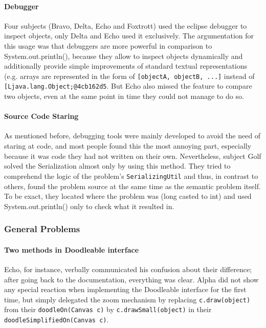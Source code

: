 \documentclass[english]{acm_proc_article-sp}
\newcommand\nes[1]{\nbc{nes}{#1}{blue}}
\begin{document}
\paragraph{Debugger}
Four subjects (Bravo, Delta, Echo and Foxtrott) used the eclipse debugger to inspect objects, only Delta and Echo used it exclusively. 
The argumentation for this usage was that debuggers are more powerful in comparison to System.out.println(), because they allow to inspect objects dynamically and additionally provide simple improvements of standard textual representations (e.g. 
arrays are represented in the form of \verb-[objectA, objectB, ...]- instead of \verb-[Ljava.lang.Object;@4cb162d5-. 
But Echo also missed the feature to compare two objects, even at the same point in time they could not manage to do so.
\paragraph{Source Code Staring}
As mentioned before, debugging tools were mainly developed to avoid the need of staring at code, and most people found this the most annoying part, especially because it was code they had not written on their own. 
Nevertheless, subject Golf solved the Serialization almost only by using this method. 
They tried to comprehend the logic of the problem's \verb.SerializingUtil. 
and thus, in contrast to others, found the problem source at the same time as the semantic problem itself. 
To be exact, they located where the problem was (long casted to int) and used System.out.println() only to check what it resulted in.

\subsubsection{General Problems}
\paragraph{Two methods in Doodleable interface}
Echo, for instance, verbally communicated his confusion about their difference; after going back to the documentation, everything was clear.\nes{This goes into the study.}
Alpha did not show any special reaction when implementing the Doodleable interface for the first time, but simply delegated the zoom mechanism by replacing \verb-c.draw(object)- from their \verb.doodleOn(Canvas c). 
by \verb-c.drawSmall(object)- in their \verb.doodleSimplifiedOn(Canvas c)..
\end{document}
